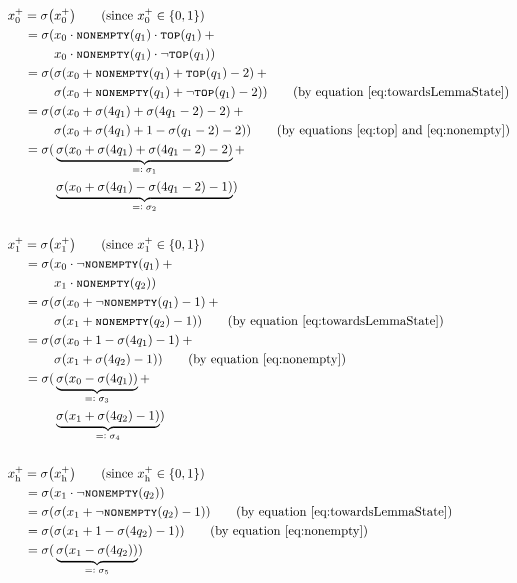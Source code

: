 \documentclass{book}
\newcommand{\eqdef}{=\vcentcolon}
\newcommand{\nonempty}{\textsc{\texttt{nonempty}}}
\newcommand{\tos}{\textsc{\texttt{top}}}
\newcommand{\h}{\mathrm{h}}
\theoremstyle{definition}
\theoremstyle{plain}
\theoremstyle{plain}
\theoremstyle{remark}
\theoremstyle{plain}
\begin{document}
	\begin{align*}
		x_0^+=\sigma\big(&x_0^+\big) \tag{since $x_0^+\in\{0,1\}$} \\
			 =\sigma(&x_0\cdot\nonempty(q_1)\cdot\tos(q_1)\:+ \\
					 &x_0\cdot\nonempty(q_1)\cdot\lnot\tos(q_1)) \\	
			 =\sigma(&\sigma(x_0+\nonempty(q_1)+\tos(q_1)-2)\:+ \\
					 &\sigma(x_0+\nonempty(q_1)+\lnot\tos(q_1)-2)) \tag{by equation \ref{eq:towardsLemmaState}}	\\
			 =\sigma(&\sigma(x_0+\sigma(4q_1)+\sigma(4q_1-2)-2)\:+ \\
					 &\sigma(x_0+\sigma(4q_1)+1-\sigma(q_1-2)-2)) \tag{by equations \ref{eq:top} and \ref{eq:nonempty}}	\\
			 =\sigma(&\underbrace{\sigma(x_0+\sigma(4q_1)+\sigma(4q_1-2)-2)}_\text{$\eqdef\sigma_1$}+ \\
					 &\underbrace{\sigma(x_0+\sigma(4q_1)-\sigma(4q_1-2)-1)}_\text{$\eqdef\sigma_2$}) \\\\
		x_1^+=\sigma\big(&x_1^+\big) \tag{since $x_1^+\in\{0,1\}$} \\
			 =\sigma(&x_0\cdot\lnot\nonempty(q_1)\:+ \\
					 &x_1\cdot\nonempty(q_2)) \\
			 =\sigma(&\sigma(x_0+\lnot\nonempty(q_1)-1)\:+ \\
					 &\sigma(x_1+\nonempty(q_2)-1)) \tag{by equation \ref{eq:towardsLemmaState}} \\
			 =\sigma(&\sigma(x_0+1-\sigma(4q_1)-1)\:+ \\
					 &\sigma(x_1+\sigma(4q_2)-1)) \tag{by equation \ref{eq:nonempty}} \\
			 =\sigma(&\underbrace{\sigma(x_0-\sigma(4q_1))}_\text{$\eqdef\sigma_3$}+ \\
					 &\underbrace{\sigma(x_1+\sigma(4q_2)-1)}_\text{$\eqdef\sigma_4$}) \\\\
		x_\h^+=\sigma\big(&x_\h^+\big) \tag{since $x_\h^+\in\{0,1\}$} \\
		     =\sigma(&x_1\cdot\lnot\nonempty(q_2)) \\
		     =\sigma(&\sigma(x_1+\lnot\nonempty(q_2)-1)) \tag{by equation \ref{eq:towardsLemmaState}}	\\
		     =\sigma(&\sigma(x_1+1-\sigma(4q_2)-1)) \tag{by equation \ref{eq:nonempty}} \\
		     =\sigma(&\underbrace{\sigma(x_1-\sigma(4q_2))}_\text{$\eqdef\sigma_5$}) \\\\

\end{align*}
\end{document}

